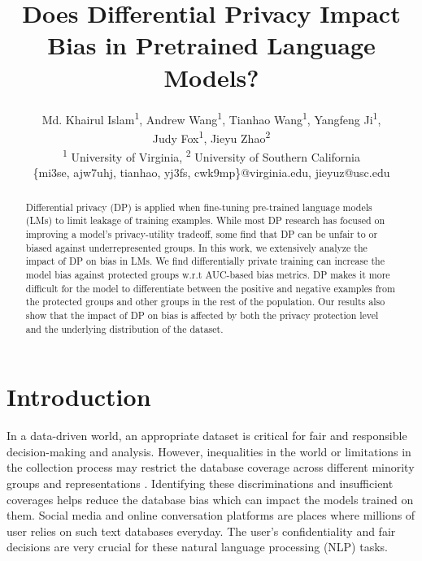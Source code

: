 \documentclass[11pt]{article} %
\begin{document}
\title{Does Differential Privacy Impact Bias in Pretrained Language Models?}
\author{
    Md. Khairul Islam\textsuperscript{\rm 1},
    Andrew Wang\textsuperscript{\rm 1},
    Tianhao Wang\textsuperscript{\rm 1},
    Yangfeng Ji\textsuperscript{\rm 1},\\
    Judy Fox\textsuperscript{\rm 1},
    Jieyu Zhao\textsuperscript{\rm 2}\\
    \textsuperscript{\rm 1} University of Virginia,
    \textsuperscript{\rm 2} University of Southern California \\
    \{mi3se, ajw7uhj, tianhao, yj3fs, cwk9mp\}@virginia.edu, jieyuz@usc.edu
}
\maketitle

\begin{abstract}

Differential privacy (DP) is applied when fine-tuning pre-trained language models (LMs) to limit leakage of training examples. While most DP research has focused on improving a model's privacy-utility tradeoff, some find that DP can be unfair to or biased against underrepresented groups. In this work, we extensively analyze the impact of DP on bias in LMs. We find differentially private training can increase the model bias against protected groups w.r.t AUC-based bias metrics. DP makes it more difficult for the model to differentiate between the positive and negative examples from the protected groups and other groups in the rest of the population. Our results also show that the impact of DP on bias is affected by both the privacy protection level and the underlying distribution of the dataset. 
\end{abstract}

\section{Introduction}

In a data-driven world, an appropriate dataset is critical for fair and responsible decision-making and analysis. However, inequalities in the world or limitations in the collection process may restrict the database coverage across different minority groups and representations \cite{shahbazi2024coverage}.  Identifying these discriminations \cite{salimi2020database} and insufficient coverages \cite{lin2020identifying} helps reduce the database bias which can impact the models trained on them. Social media and online conversation platforms are places where millions of user relies on such text databases everyday. The user's confidentiality and fair decisions are very crucial for these natural language processing (NLP) tasks.
\end{document}
